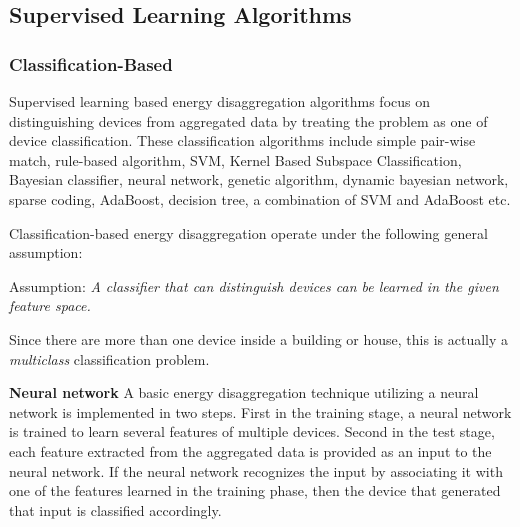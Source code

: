 \subsection{Supervised Learning Algorithms}
\subsubsection{Classification-Based}
\label{sec:supervised}
Supervised learning based energy disaggregation algorithms focus on distinguishing devices from aggregated data 
by treating the problem as one of device classification.
These classification algorithms include
simple pair-wise match, rule-based algorithm,
SVM, Kernel Based Subspace Classification,
Bayesian classifier, neural network,
genetic algorithm,
dynamic bayesian network,
sparse coding,
AdaBoost,
decision tree,
a combination of SVM and AdaBoost etc.

Classification-based energy disaggregation operate under 
the following general assumption: 

Assumption: \textit{A classifier that can distinguish devices 
can be learned in the given feature space.}

Since there are more than one device inside a building or house,  
this is actually a  {\em multiclass} classification problem.  


\textbf{Neural network}
A basic energy disaggregation technique utilizing a neural network 
is implemented in two steps. 
First in the training stage, a neural network is trained 
to learn several features of multiple devices. 
Second in the test stage, each feature extracted from the aggregated data 
is provided as an input to the neural network. 
If the neural network recognizes the input by associating it with one of the features learned in the training phase, then the device that generated that input is classified accordingly. 

